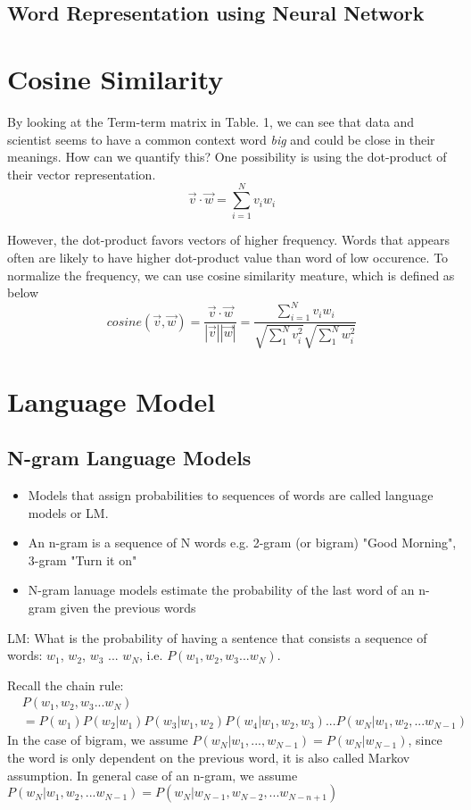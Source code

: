 \documentclass[12pt, oneside]{article}
\begin{document}
\subsection{Word Representation using Neural Network}

\section{Cosine Similarity}

By looking at the Term-term matrix in Table. 1, we can see that data and scientist seems to have a common context word \textit{big} and could be close in their meanings. How can we quantify this? One possibility is using the dot-product of their vector representation.
$$
\vec{v}\cdot\vec{w}=\sum_{i=1}^N v_i w_i
$$

However, the dot-product favors vectors of higher frequency. Words that appears often are likely to have higher dot-product value than word of low occurence. To normalize the frequency, we can use cosine similarity meature, which is defined as below 
$$
cosine(\vec{v}, \vec{w})=\frac{\vec{v}\cdot\vec{w}}{|\vec{v}||\vec{w}|}=\frac{\sum_{i=1}^N v_i w_i}{\sqrt{\sum_1^N v_i^2}\sqrt{\sum_1^N w_i^2}}
$$




\section{Language Model}

\subsection{N-gram Language Models}
\begin{itemize}
\item Models that assign probabilities to sequences of words are called language models or LM.
\item An n-gram is a sequence of N words e.g. 2-gram (or bigram) "Good Morning", 3-gram "Turn it on"
\item N-gram lanuage models estimate the probability of the last word of an n-gram given the previous words
\end{itemize}

LM: What is the probability of having a sentence that consists a sequence of words: $w_1$, $w_2$, $w_3$ ... $w_N$, i.e. $P(w_1, w_2, w_3...w_N)$. 

Recall the chain rule:
\begin{align*}
&P(w_1, w_2, w_3...w_N)\\
&=P(w_1)P(w_2|w_1)P(w_3|w_1, w_2)P(w_4|w_1, w_2, w_3)...P(w_N|w_1, w_2, ...w_{N-1})
\end{align*}
In the case of bigram, we assume $P(w_N|w_1,...,w_{N-1})=P(w_N|w_{N-1})$, since the word is only dependent on the previous word, it is also called Markov assumption.
\vspace{0.2cm}
In general case of an n-gram, we assume $P(w_N|w_1, w_2, ...w_{N-1})=P(w_N|w_{N-1}, w_{N-2}, ...w_{N-n+1})$
\end{document}

